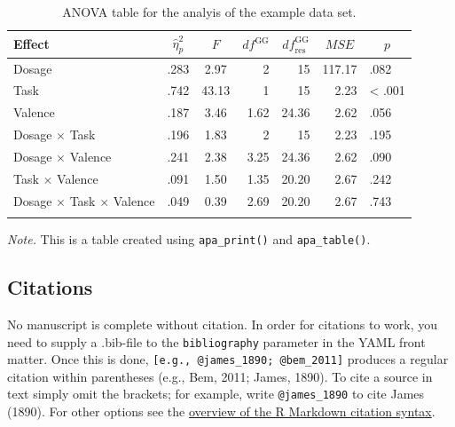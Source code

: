 \documentclass[
  man,floatsintext]{apa6}
\begin{document}
\begin{table}[tbp]

\begin{center}
\begin{threeparttable}

\caption{\label{tab:anova}ANOVA table for the analyis of the example data set.}

\begin{tabular}{lrcrrrl}
\toprule
Effect & \multicolumn{1}{c}{$\hat{\eta}^2_p$} & \multicolumn{1}{c}{$F$} & \multicolumn{1}{c}{$\mathit{df}^{\mathrm{GG}}$} & \multicolumn{1}{c}{$\mathit{df}_{\mathrm{res}}^{\mathrm{GG}}$} & \multicolumn{1}{c}{$\mathit{MSE}$} & \multicolumn{1}{c}{$p$}\\
\midrule
Dosage & .283 & 2.97 & 2 & 15 & 117.17 & .082\\
Task & .742 & 43.13 & 1 & 15 & 2.23 & < .001\\
Valence & .187 & 3.46 & 1.62 & 24.36 & 2.62 & .056\\
Dosage $\times$ Task & .196 & 1.83 & 2 & 15 & 2.23 & .195\\
Dosage $\times$ Valence & .241 & 2.38 & 3.25 & 24.36 & 2.62 & .090\\
Task $\times$ Valence & .091 & 1.50 & 1.35 & 20.20 & 2.67 & .242\\
Dosage $\times$ Task $\times$ Valence & .049 & 0.39 & 2.69 & 20.20 & 2.67 & .743\\
\bottomrule
\addlinespace
\end{tabular}

\begin{tablenotes}[para]
\normalsize{\textit{Note.} This is a table created using \texttt{apa\_print()} and \texttt{apa\_table()}.}
\end{tablenotes}

\end{threeparttable}
\end{center}

\end{table}

\subsection{Citations}\label{citations}

No manuscript is complete without citation.
In order for citations to work, you need to supply a .bib-file to the \texttt{bibliography} parameter in the YAML front matter.
Once this is done, \texttt{{[}e.g.,\ @james\_1890;\ @bem\_2011{]}} produces a regular citation within parentheses (e.g., Bem, 2011; James, 1890).
To cite a source in text simply omit the brackets; for example, write \texttt{@james\_1890} to cite James (1890).
For other options see the \href{https://rmarkdown.rstudio.com/authoring_bibliographies_and_citations.html}{overview of the R Markdown citation syntax}.
\end{document}
